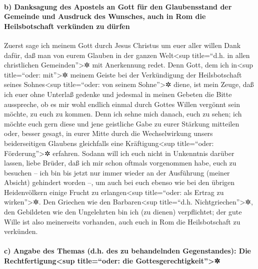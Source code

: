 \hypertarget{b-danksagung-des-apostels-an-gott-fuxfcr-den-glaubensstand-der-gemeinde-und-ausdruck-des-wunsches-auch-in-rom-die-heilsbotschaft-verkuxfcnden-zu-duxfcrfen}{%
\paragraph{b) Danksagung des Apostels an Gott für den Glaubensstand der
Gemeinde und Ausdruck des Wunsches, auch in Rom die Heilsbotschaft
verkünden zu
dürfen}\label{b-danksagung-des-apostels-an-gott-fuxfcr-den-glaubensstand-der-gemeinde-und-ausdruck-des-wunsches-auch-in-rom-die-heilsbotschaft-verkuxfcnden-zu-duxfcrfen}}

 Zuerst sage ich meinem Gott durch Jesus Christus um euer
aller willen Dank dafür, daß man von eurem Glauben in der ganzen
Welt\textless sup title=``d.h. in allen christlichen
Gemeinden''\textgreater✲ mit Anerkennung redet.  Denn
Gott, dem ich in\textless sup title=``oder: mit''\textgreater✲ meinem
Geiste bei der Verkündigung der Heilsbotschaft seines
Sohnes\textless sup title=``oder: von seinem Sohne''\textgreater✲ diene,
ist mein Zeuge, daß ich euer ohne Unterlaß gedenke  und
jedesmal in meinen Gebeten die Bitte ausspreche, ob es mir wohl endlich
einmal durch Gottes Willen vergönnt sein möchte, zu euch zu kommen.
 Denn ich sehne mich danach, euch zu sehen; ich möchte
euch gern diese und jene geistliche Gabe zu eurer Stärkung mitteilen
 oder, besser gesagt, in eurer Mitte durch die
Wechselwirkung unsers beiderseitigen Glaubens gleichfalls eine
Kräftigung\textless sup title=``oder: Förderung''\textgreater✲ erfahren.
 Sodann will ich euch nicht in Unkenntnis darüber lassen,
liebe Brüder, daß ich mir schon oftmals vorgenommen habe, euch zu
besuchen -- ich bin bis jetzt nur immer wieder an der Ausführung (meiner
Absicht) gehindert worden --, um auch bei euch ebenso wie bei den
übrigen Heidenvölkern einige Frucht zu erlangen\textless sup
title=``oder: als Ertrag zu wirken''\textgreater✲.  Den
Griechen wie den Barbaren\textless sup title=``d.h.
Nichtgriechen''\textgreater✲, den Gebildeten wie den Ungelehrten bin ich
(zu dienen) verpflichtet;  der gute Wille ist also
meinerseits vorhanden, auch euch in Rom die Heilsbotschaft zu verkünden.

\hypertarget{c-angabe-des-themas-d.h.-des-zu-behandelnden-gegenstandes-die-rechtfertigungsup-titleoder-die-gottesgerechtigkeit}{%
\paragraph{c) Angabe des Themas (d.h. des zu behandelnden Gegenstandes):
Die Rechtfertigung\textless sup title=``oder: die
Gottesgerechtigkeit''\textgreater✲}\label{c-angabe-des-themas-d.h.-des-zu-behandelnden-gegenstandes-die-rechtfertigungsup-titleoder-die-gottesgerechtigkeit}}

